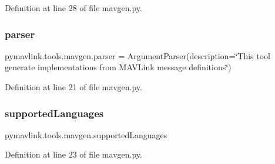 Definition at line 28 of file mavgen.\+py.

\mbox{\label{namespacepymavlink_1_1tools_1_1mavgen_a75961cc4774b7274c1b2beb747c502b5}} 
\subsubsection{\texorpdfstring{parser}{parser}}
{\footnotesize\ttfamily pymavlink.\+tools.\+mavgen.\+parser = Argument\+Parser(description=\char`\"{}This tool generate implementations from M\+A\+V\+Link message definitions\char`\"{})}



Definition at line 21 of file mavgen.\+py.

\mbox{\label{namespacepymavlink_1_1tools_1_1mavgen_a59e9627cc807847e3c72205eecc64d22}} 
\subsubsection{\texorpdfstring{supportedLanguages}{supportedLanguages}}
{\footnotesize\ttfamily pymavlink.\+tools.\+mavgen.\+supported\+Languages}



Definition at line 23 of file mavgen.\+py.

